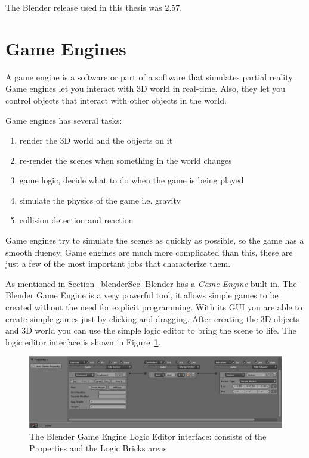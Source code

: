 The Blender release used in this thesis was 2.57.

\section{Game Engines}

A game engine is a software or part of a software that simulates partial reality\cite{bookGameKit2}. Game engines let you interact with 3D world in real-time. Also, they let you control objects that interact with other objects in the world. 

Game engines has several tasks:
\begin{enumerate}
\item{render the 3D world and the objects on it}
\item{re-render the scenes when something in the world changes}
\item{game logic, decide what to do when the game is being played}
\item{simulate the physics of the game i.e. gravity}
\item{collision detection and reaction}
\end{enumerate}

Game engines try to simulate the scenes as quickly as possible, so the game has a smooth fluency. Game engines are much more complicated than this, these are just a few of the most important jobs that characterize them.

As mentioned in Section~\ref{blenderSec} Blender has a \textit{Game Engine} built-in. The Blender Game Engine is a very powerful tool, it allows simple games to be created without  the need for explicit programming. With its GUI you are able to create simple games just by clicking and dragging. After creating the 3D objects and 3D world you can use the simple logic editor to bring the scene to life. The logic editor interface is shown in Figure~\ref{logic}.

\begin{figure}[htbp]
\begin{center}
\includegraphics[scale=0.4]{figures/logic.pdf}
\caption{The Blender Game Engine Logic Editor interface: consists of the Properties and the Logic Bricks areas}
\label{logic}
\end{center}
\end{figure}

